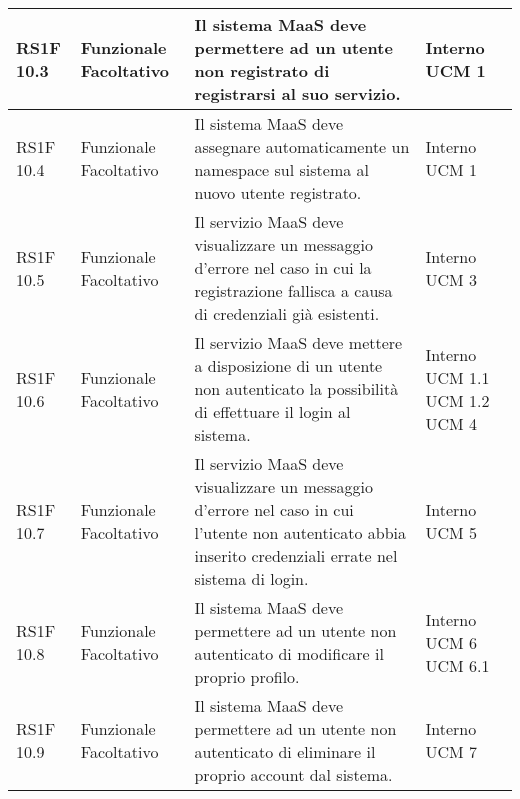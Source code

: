 \begin{center}
\begin{longtable}{ | l | p{2cm} | p{5cm} | p{1.7cm} |}
        RS1F 10.3 & Funzionale \newline  Facoltativo  & Il sistema MaaS deve permettere ad un utente non registrato di registrarsi al suo servizio. &  Interno \newline  UCM 1 \newline  \\ \hline      
        RS1F 10.4 & Funzionale \newline  Facoltativo  & Il sistema MaaS deve assegnare automaticamente un namespace sul sistema al nuovo utente registrato. &  Interno \newline  UCM 1 \newline  \\ \hline      
        RS1F 10.5 & Funzionale \newline  Facoltativo  & Il servizio MaaS deve visualizzare un messaggio d’errore nel caso in cui la registrazione fallisca a causa di credenziali già esistenti. &  Interno \newline  UCM 3 \newline  \\ \hline      
        RS1F 10.6 & Funzionale \newline  Facoltativo  & Il servizio MaaS deve mettere a disposizione di un utente non autenticato la possibilità di effettuare il login al sistema. &  Interno \newline  UCM 1.1 \newline  UCM 1.2 \newline  UCM 4 \newline  \\ \hline      
        RS1F 10.7 & Funzionale \newline  Facoltativo  & Il servizio MaaS deve visualizzare un messaggio d’errore nel caso in cui l’utente non autenticato abbia inserito credenziali errate nel sistema di login. &  Interno \newline  UCM 5 \newline  \\ \hline      
        RS1F 10.8 & Funzionale \newline  Facoltativo  & Il sistema MaaS deve permettere ad un utente non autenticato di modificare il proprio profilo. &  Interno \newline  UCM 6 \newline  UCM 6.1 \newline  \\ \hline      
        RS1F 10.9 & Funzionale \newline  Facoltativo  & Il sistema MaaS deve permettere ad un utente non autenticato di eliminare il proprio account dal sistema. &  Interno \newline  UCM 7 \newline  \\ \hline      

\end{longtable}
\end{center}
